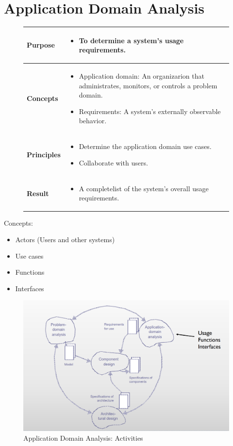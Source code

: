 \part{Application Domain Analysis}
\begin{figure}[H]
    \begin{tabular}{|l|p{12cm}|}
        \hline
        \textbf{Purpose} & \begin{itemize}
            \item To determine a system's usage requirements.
        \end{itemize} \\\hline
        \textbf{Concepts} & \begin{itemize}
            \item Application domain: An organizarion that administrates, monitors, or controls a problem domain.
            \item Requirements: A system's externally observable behavior.
        \end{itemize} \\\hline
        \textbf{Principles} & \begin{itemize}
            \item Determine the application domain use cases.
            \item Collaborate with users.
        \end{itemize} \\\hline
        \textbf{Result} & \begin{itemize}
            \item A completelist of the system's overall usage requirements.
        \end{itemize} \\\hline
    \end{tabular}
\end{figure}
Concepts:
\begin{itemize}
    \item Actors (Users and other systems)
    \item Use cases
    \item Functions
    \item Interfaces
\end{itemize}
\begin{figure}[]
    \centering
    \includegraphics[width=\linewidth]{parts/3_application_domain_analysis/figures/activities.png}
    \caption{Application Domain Analysis: Activities}
\end{figure}
